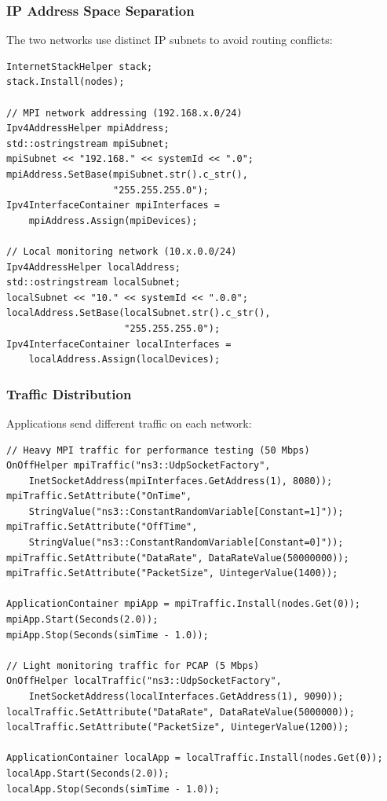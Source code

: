 \subsubsection{IP Address Space Separation}

The two networks use distinct IP subnets to avoid routing conflicts:

\begin{lstlisting}[style=cpp, caption={Dual IP stack configuration}]
InternetStackHelper stack;
stack.Install(nodes);

// MPI network addressing (192.168.x.0/24)
Ipv4AddressHelper mpiAddress;
std::ostringstream mpiSubnet;
mpiSubnet << "192.168." << systemId << ".0";
mpiAddress.SetBase(mpiSubnet.str().c_str(), 
                   "255.255.255.0");
Ipv4InterfaceContainer mpiInterfaces = 
    mpiAddress.Assign(mpiDevices);

// Local monitoring network (10.x.0.0/24)
Ipv4AddressHelper localAddress;
std::ostringstream localSubnet;
localSubnet << "10." << systemId << ".0.0";
localAddress.SetBase(localSubnet.str().c_str(), 
                     "255.255.255.0");
Ipv4InterfaceContainer localInterfaces = 
    localAddress.Assign(localDevices);
\end{lstlisting}

\subsubsection{Traffic Distribution}

Applications send different traffic on each network:

\begin{lstlisting}[style=cpp, caption={Dual-network traffic generation}]
// Heavy MPI traffic for performance testing (50 Mbps)
OnOffHelper mpiTraffic("ns3::UdpSocketFactory",
    InetSocketAddress(mpiInterfaces.GetAddress(1), 8080));
mpiTraffic.SetAttribute("OnTime", 
    StringValue("ns3::ConstantRandomVariable[Constant=1]"));
mpiTraffic.SetAttribute("OffTime", 
    StringValue("ns3::ConstantRandomVariable[Constant=0]"));
mpiTraffic.SetAttribute("DataRate", DataRateValue(50000000));
mpiTraffic.SetAttribute("PacketSize", UintegerValue(1400));

ApplicationContainer mpiApp = mpiTraffic.Install(nodes.Get(0));
mpiApp.Start(Seconds(2.0));
mpiApp.Stop(Seconds(simTime - 1.0));

// Light monitoring traffic for PCAP (5 Mbps)
OnOffHelper localTraffic("ns3::UdpSocketFactory",
    InetSocketAddress(localInterfaces.GetAddress(1), 9090));
localTraffic.SetAttribute("DataRate", DataRateValue(5000000));
localTraffic.SetAttribute("PacketSize", UintegerValue(1200));

ApplicationContainer localApp = localTraffic.Install(nodes.Get(0));
localApp.Start(Seconds(2.0));
localApp.Stop(Seconds(simTime - 1.0));
\end{lstlisting}

